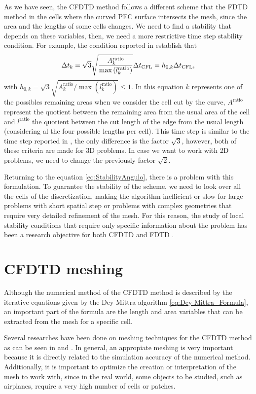 \documentclass[12pt, oneside]{book}
\begin{document}
As we have seen, the CFDTD method follows a different scheme that the FDTD method in the cells where the curved PEC surface intersects the mesh, since the area and the lengths of some cells changes. We need to find a stability that depends on these variables, then, we need a more restrictive time step stability condition. For example, the condition reported in \cite{7518629} establish that
\begin{equation}
    \Delta t_k = \sqrt{3} \sqrt{\dfrac{A_k^{\text{ratio}}}{\max \left( l_k^{\text{ratio}} \right)}}\Delta t_{\text{\text{CFL}}} = h_{0, k} \Delta t_{\text{CFL}},
\label{eq:StabilityAngulo}
\end{equation}
with $h_{0, k} = \sqrt{3} \sqrt{A_k^{\text{ratio}}/\max \left( l_k^{\text{ratio}} \right)} \leq 1$. In this equation $k$ represents one of the possibles remaining areas when we consider the cell cut by the curve, $A^{\text{ratio}}$ represent the quotient between the remaining area from the usual area of the cell and $l^{\text{ratio}}$ the quotient between the cut length of the edge from the usual length (considering al the four possible lengths per cell). This time step is similar to the time step reported in \cite{1638381}, the only difference is the factor $\sqrt{3}$, however, both of these criteria are made for 3D problems. In case we want to work with 2D problems, we need to change the previously factor $\sqrt{2}$.

Returning to the equation \ref{eq:StabilityAngulo}, there is a problem with this formulation. To guarantee the stability of the scheme, we need to look over all the cells of the discretization, making the algorithm inefficient or slow for large problems with short spatial step or problems with complex geometries that require very detailed refinement of the mesh. For this reason, the study of local stability conditions that require only specific information about the problem has been a research objective for both CFDTD and FDTD \cite{7779120}.

\section{CFDTD meshing}

Although the numerical method of the CFDTD method is described by the iterative equations given by the Dey-Mittra algorithm \ref{eq:Dey-Mittra_Formula}, an important part of the formula are the length and area variables that can be extracted from the mesh for a specific cell. 

Several researches have been done on meshing techniques for the CFDTD method as can be seen in \cite{CFDTDMesh1} and \cite{CFDTDMesh2}. In general, an appropiate meshing is very important because it is directly related to the simulation accuracy of the numerical method. Additionally, it is important to optimize the creation or interpretation of the mesh to work with, since in the real world, some objects to be studied, such as airplanes, require a very high number of cells or patches.
\end{document}
